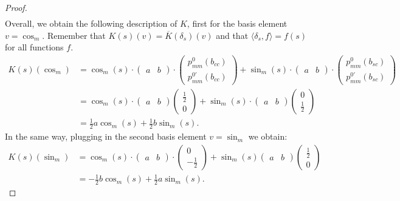 \documentclass[12pt, a4paper]{article}
\theoremstyle{plain}
\theoremstyle{definition}
\theoremstyle{remark}
\begin{document}
\begin{proof}
\begin{align*}
\end{align*} 
Overall, we obtain the following description of $K$, first for the basis element $v = \cos_m$. Remember that $K(s)(v) = \overline{K}(\delta_s)(v)$ and that $\langle \delta_s, f \rangle = f(s)$ for all functions $f$. 
\begin{align*}
K(s)(\cos_m) & = \cos_m(s) \cdot \begin{pmatrix} a & b\end{pmatrix} \cdot \begin{pmatrix} p_{mm}^0(b_{cc}) \\ p_{mm}^{0'}(b_{cc})\end{pmatrix} + \sin_m(s) \cdot \begin{pmatrix} a & b\end{pmatrix} \cdot \begin{pmatrix} p_{mm}^{0}(b_{sc}) \\ p_{mm}^{0'}(b_{sc})\end{pmatrix} \\
& = \cos_m(s) \cdot \begin{pmatrix} a & b\end{pmatrix} \begin{pmatrix} \frac{1}{2} \\ 0 \end{pmatrix} + \sin_m(s) \cdot \begin{pmatrix} a & b \end{pmatrix} \begin{pmatrix} 0 \\ \frac{1}{2}\end{pmatrix} \\
& = \frac{1}{2} a \cos_m(s) + \frac{1}{2} b \sin_m(s).
\end{align*}
In the same way, plugging in the second basis element $v = \sin_m$ we obtain:
\begin{align*}
K(s)(\sin_m) & = \cos_m(s) \cdot \begin{pmatrix} a & b \end{pmatrix} \cdot \begin{pmatrix} 0 \\ - \frac{1}{2} \end{pmatrix} + \sin_m(s) \begin{pmatrix} a & b\end{pmatrix} \begin{pmatrix} \frac{1}{2} \\ 0 \end{pmatrix} \\
& = - \frac{1}{2} b \cos_m(s) + \frac{1}{2} a \sin_m(s).

\end{align*}
\end{proof}
\end{document}
